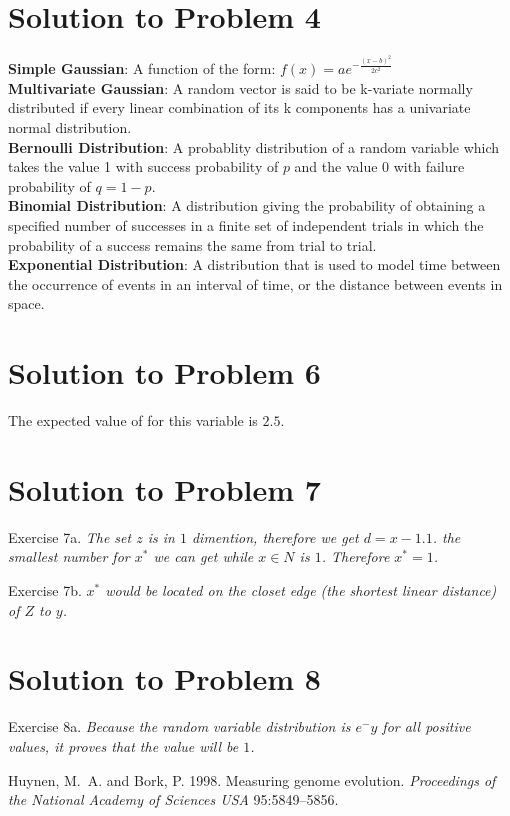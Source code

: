 \documentclass[a4paper]{article}
\newenvironment{exercise}[1][]{%
  \bigskip                          %
  \noindent \textsf{Exercise #1.\quad}\slshape }{}
\begin{document}
\section{Solution to Problem 4}
\textbf{Simple Gaussian}: A function of the form: $f(x) = ae^{-\frac{(x-b)^2}{2c^2}}$ \\
\textbf{Multivariate Gaussian}:  A random vector is said to be k-variate normally distributed if every linear combination of its k components has a univariate normal distribution. \\
\textbf{Bernoulli Distribution}: A probablity distribution of a random variable which takes the value 1 with success probability of $p$ and the value $0$ with failure probability of $q=1-p$. \\
\textbf{Binomial Distribution}: A distribution giving the probability of obtaining a specified number of successes in a finite set of independent trials in which the probability of a success remains the same from trial to trial. \\
\textbf{Exponential Distribution}: A distribution that is used to model time between the occurrence of events in an interval of time, or the distance between events in space.


\section{Solution to Problem 6}
The expected value of for this variable is $2.5$.

\section{Solution to Problem 7}

\begin{exercise}[7a]
The set $z$ is in $1$ dimention, therefore we get $d = x - 1.1$. the smallest number for $x^*$ we can get while $x \in N$ is $1$. Therefore $x^* = 1$.
\end{exercise}

\begin{exercise}[7b]
$x^*$ would be located on the closet edge (the shortest linear distance) of $Z$ to $y$.
\end{exercise}

\section{Solution to Problem 8}
\begin{exercise}[8a]
Because the random variable distribution is $e^-y$ for all positive values, it proves that the value will be $1$.
\end{exercise}

\footnotesize
\begin{thebibliography}{99}

   Huynen, M.~A. and Bork, P. 1998. Measuring genome evolution.
    \emph{Proceedings of the National Academy of Sciences USA} 95:5849--5856.

\end{thebibliography}
\end{document}

